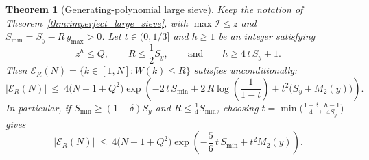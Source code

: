 \documentclass[11pt, a4paper]{article}
\theoremstyle{plain}
\newtheorem{theorem}{Theorem}[section]
\theoremstyle{definition}
\begin{document}
\begin{theorem}[Generating-polynomial large sieve]\label{thm:generating_polynomial_large_sieve}
Keep the notation of Theorem~\ref{thm:imperfect_large_sieve}, with $\max\mathcal{I}\le z$ and $S_{\min}=S_y-R\,y_{\max}>0$. Let $t\in(0,1/3]$ and $h\ge1$ be an integer satisfying
\begin{equation}\label{eq:gen_poly_conditions}
z^{h}\le Q,\qquad R\le\frac12 S_y,\qquad\text{and}\qquad h\ge 4\,t\,S_y+1.
\end{equation}
Then $\mathcal{E}_R(N)=\{k\in[1,N]:W(k)\le R\}$ satisfies unconditionally:
\begin{equation}\label{eq:gen_poly_large_sieve_bound}
|\mathcal{E}_R(N)|\ \le\ 4\big(N-1+Q^{2}\big)\exp\!\left(-2\,t\,S_{\min}+2\,R\log\!\left(\frac{1}{1-t}\right)+t^{2}\big(S_y+M_2(y)\big)\right).
\end{equation}
In particular, if $S_{\min}\ge(1-\delta)S_y$ and $R\le\frac14 S_{\min}$, choosing $t=\min\!\big(\frac{1-\delta}{4},\frac{h-1}{4S_y}\big)$ gives
\begin{equation}\label{eq:gen_poly_simplified_bound}
|\mathcal{E}_R(N)|\ \le\ 4\big(N-1+Q^{2}\big)\exp\!\left(-\frac56\,t\,S_{\min}+t^{2}M_2(y)\right).
\end{equation}
\end{theorem}
\end{document}
